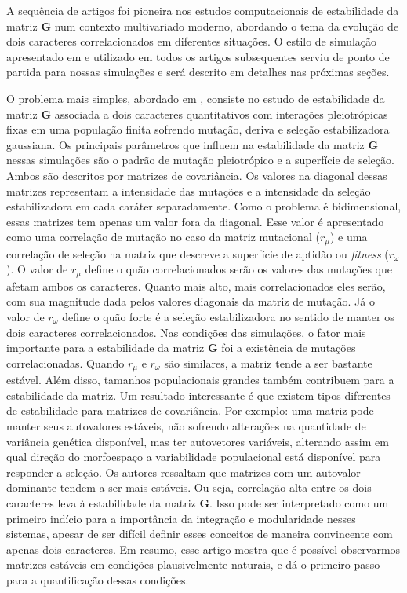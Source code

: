 A sequência de artigos \cite{Jones2003, Jones2004, Jones2007} foi
pioneira nos estudos computacionais de estabilidade da matriz $\mathbf{G}$ num
contexto multivariado moderno, abordando o tema da evolução de dois
caracteres correlacionados em diferentes situações.
O estilo de simulação apresentado em \cite{Jones2003} e utilizado em
todos os artigos subsequentes serviu de ponto de partida para nossas
simulações e será descrito em detalhes nas próximas seções.

O problema mais simples, abordado em \cite{Jones2003}, consiste no
estudo de estabilidade da matriz $\mathbf{G}$ associada a dois caracteres
quantitativos com interações pleiotrópicas fixas em uma população finita
sofrendo mutação, deriva e seleção estabilizadora gaussiana.
Os principais parâmetros que influem na estabilidade da matriz
$\mathbf{G}$ nessas simulações são o padrão de mutação pleiotrópico e a
superfície de seleção.
Ambos são descritos por matrizes de covariância.
Os valores na diagonal dessas matrizes representam a intensidade das
mutações e a intensidade da seleção estabilizadora em cada caráter
separadamente.
Como o problema é bidimensional, essas matrizes tem apenas um valor fora
da diagonal.
Esse valor é apresentado como uma correlação de mutação no caso da
matriz mutacional ($r_\mu$) e uma correlação de seleção na matriz que
descreve a superfície de aptidão ou {\it fitness} ($r_\omega$).
O valor de $r_\mu$ define o quão correlacionados serão os valores das
mutações que afetam ambos os caracteres.
Quanto mais alto, mais correlacionados eles serão, com sua magnitude
dada pelos valores diagonais da matriz de mutação.
Já o valor de $r_\omega$ define o quão forte é a seleção estabilizadora
no sentido de manter os dois caracteres correlacionados.
Nas condições das simulações, o fator mais importante para a
estabilidade da matriz $\mathbf{G}$ foi a existência de mutações correlacionadas.
Quando $r_\mu$ e $r_\omega$ são similares, a matriz tende a ser bastante
estável.
Além disso, tamanhos populacionais grandes também contribuem para a
estabilidade da matriz.
Um resultado interessante é que existem tipos diferentes de estabilidade
para matrizes de covariância.
Por exemplo: uma matriz pode manter seus autovalores estáveis, não
sofrendo alterações na quantidade de variância genética disponível, mas
ter autovetores variáveis, alterando assim em qual direção do
morfoespaço a variabilidade populacional está disponível para responder
a seleção.
Os autores ressaltam que matrizes com um autovalor dominante tendem a
ser mais estáveis.
Ou seja, correlação alta entre os dois caracteres leva à estabilidade da
matriz $\mathbf{G}$.
Isso pode ser interpretado como um primeiro indício para a importância
da integração e modularidade nesses sistemas, apesar de ser difícil definir
esses conceitos de maneira convincente com apenas dois caracteres.
Em resumo, esse artigo mostra que é possível observarmos matrizes
estáveis em condições plausivelmente naturais, e dá o primeiro passo
para a quantificação dessas condições.


